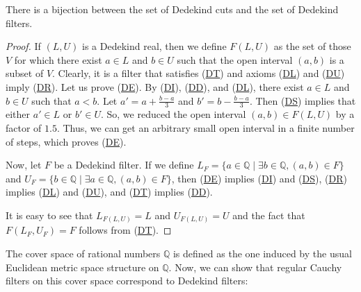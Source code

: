 \documentclass[reqno]{amsart}
\newcommand{\axref}[1]{(\hyperref[ax:#1]{#1})}
\theoremstyle{definition}
\theoremstyle{remark}
\numberwithin{figure}{section}
\begin{document}
\begin{prop}
There is a bijection between the set of Dedekind cuts and the set of Dedekind filters.
\end{prop}
\begin{proof}
If $(L,U)$ is a Dedekind real, then we define $F(L,U)$ as the set of those $V$ for which there exist $a \in L$ and $b \in U$ such that the open interval $(a,b)$ is a subset of $V$.
Clearly, it is a filter that satisfies \axref{DT} and axioms \axref{DL} and \axref{DU} imply \axref{DR}.
Let us prove \axref{DE}.
By \axref{DI}, \axref{DD}, and \axref{DL}, there exist $a \in L$ and $b \in U$ such that $a < b$.
Let $a' = a + \frac{b - a}{3}$ and $b' = b - \frac{b - a}{3}$.
Then \axref{DS} implies that either $a' \in L$ or $b' \in U$.
So, we reduced the open interval $(a,b) \in F(L,U)$ by a factor of $1.5$.
Thus, we can get an arbitrary small open interval in a finite number of steps, which proves \axref{DE}.

Now, let $F$ be a Dedekind filter.
If we define $L_F = \{ a \in \mathbb{Q} \mid \exists b \in \mathbb{Q}, (a,b) \in F \}$ and $U_F = \{ b \in \mathbb{Q} \mid \exists a \in \mathbb{Q}, (a,b) \in F \}$,
then \axref{DE} implies \axref{DI} and \axref{DS}, \axref{DR} implies \axref{DL} and \axref{DU}, and \axref{DT} implies \axref{DD}.

It is easy to see that $L_{F(L,U)} = L$ and $U_{F(L,U)} = U$ and the fact that $F(L_F,U_F) = F$ follows from \axref{DT}.
\end{proof}

The cover space of rational numbers $\mathbb{Q}$ is defined as the one induced by the usual Euclidean metric space structure on $\mathbb{Q}$.
Now, we can show that regular Cauchy filters on this cover space correspond to Dedekind filters:
\end{document}
